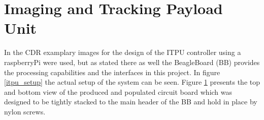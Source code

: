  
\section{Imaging and Tracking Payload Unit}

In the CDR examplary images for the design of the ITPU controller using a raspberryPi were used, but as stated there as well the BeagleBoard (BB) provides the processing capabilities and the interfaces in this project. In figure \ref{itpu_setup} the actual setup of the system can be seen. Figure \ref{fig:itpu_pcb} presents the top and bottom view of the produced and populated circuit board which was designed to be tightly stacked to the main header of the BB and hold in place by nylon screws.

\begin{figure}
\label{fig:itpu_pcb}
\begin{centering}
\end{centering}
\end{figure}
